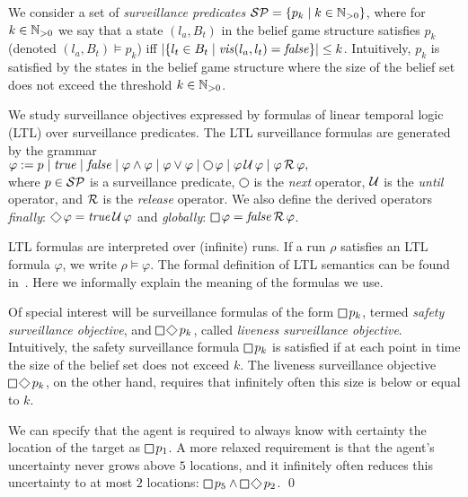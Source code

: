 We consider a set of \emph{surveillance predicates} $\mathcal{SP} = \{p_k \mid k \in \mathbb{N}_{>0}\}$, where for $k \in \mathbb{N}_{>0}$ we say that a state $(l_a,B_t)$ in the belief game structure satisfies $p_k$ (denoted $(l_a,B_t) \models p_k$) iff 
$|\{l_t \in B_t \mid \mathit{vis}(l_a,l_t)  = \mathit{false} \}| \leq k$. Intuitively, $p_k$ is satisfied by the states in the belief game structure where the size of the belief set does not exceed the threshold $k \in \mathbb{N}_{>0}$.

We study surveillance objectives expressed by formulas of linear temporal logic (LTL) over surveillance predicates.
 The LTL surveillance formulas  are generated by the grammar\\
$\varphi := p \mid \true \mid \false \mid \varphi \wedge \varphi \mid \varphi \vee \varphi \mid \LTLnext  \varphi  \mid \varphi \LTLuntil \varphi \mid \varphi \LTLrelease \varphi,$\\
where $p \in \mathcal{SP}$ is a surveillance predicate, $\LTLnext$ is the \emph{next} operator, $\operatorname{\mathcal{U}}$ is the \emph{until} operator, and $\operatorname{\mathcal{R}}$ is the \emph{release} operator. We also define the derived operators 
\emph{finally}: $\LTLfinally \varphi = \true \LTLuntil \varphi$ and 
\emph{globally}: $\LTLglobally \varphi = \false \LTLrelease \varphi$.

LTL formulas are interpreted over (infinite) runs. If a run $\rho$ satisfies an LTL formula $\varphi$, we write $\rho \models \varphi$. The formal definition of LTL semantics can be found in~\cite{BaierKatoen08}. Here we informally explain the meaning of the formulas we use.

Of special interest will be surveillance formulas of the form $\LTLglobally p_k$, termed \emph{safety surveillance objective}, and $\LTLglobally\LTLfinally p_k$, called \emph{liveness surveillance objective}.
Intuitively, the safety surveillance formula $\LTLglobally p_k$ is satisfied if at each point in time the size of the belief set does not exceed $k$. The liveness surveillance objective $\LTLglobally\LTLfinally p_k$, on the other hand, requires that infinitely often this size is below or equal to $k$.

\begin{example}
We can specify that the agent is required to always know with certainty the location of the target as
$\LTLglobally p_1$.
A more relaxed requirement is that the agent's uncertainty never grows above $5$ locations, and it infinitely often reduces this uncertainty to at most $2$ locations: $\LTLglobally p_5 \wedge \LTLglobally\LTLfinally p_2$.
\qed
\end{example}


